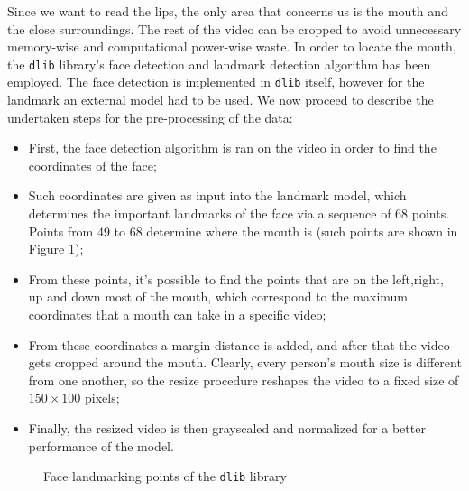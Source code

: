 \documentclass[11pt,journal]{IEEEtran}
\begin{document}
Since we want to read the lips, the only area that concerns us is the mouth and the close surroundings. The rest of the video can be cropped to avoid unnecessary memory-wise and computational power-wise waste. In order to locate the mouth, the \texttt{dlib} \cite{gunileo:dlib} library's face detection and landmark detection algorithm has been employed. The face detection is implemented in \texttt{dlib} itself, however for the landmark an external model had to be used. We now proceed to describe the undertaken steps for the pre-processing of the data:
\begin{itemize}
    \item [1)] First, the face detection algorithm is ran on the video in order to find the coordinates of the face;
    \item [2)] Such coordinates are given as input into the landmark model, which determines the important landmarks of the face via a sequence of 68 points. Points from 49 to 68 determine where the mouth is (such points are shown in Figure \ref{face_landmark_points});
    \item [3)] From these points, it's possible to find the points that are on the left,right, up and down most of the mouth, which correspond to the maximum coordinates that a mouth can take in a specific video;
    \item [4)] From these coordinates a margin distance is added, and after that the video gets cropped around the mouth. Clearly, every person's mouth size is different from one another, so the resize procedure reshapes the video to a fixed size of $150 \times 100$ pixels;
    \item [5)] Finally, the resized video is then grayscaled and normalized for a better performance of the model.
\end{itemize}

\begin{figure}
    \renewcommand{\arraystretch}{1.3}
    \caption{Face landmarking points of the \texttt{dlib} library}
    \label{face_landmark_points}
\end{figure}
\end{document}
